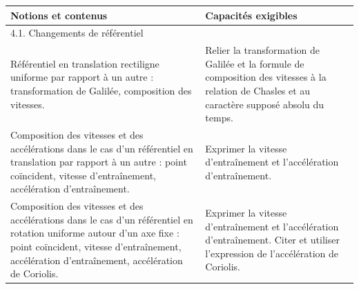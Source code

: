 \begin{tabularx}{\textwidth}[t]{|X|X|}
  \hline \textbf{Notions et contenus} & \textbf{Capacités exigibles} \\
  \hline \multicolumn{2}{|l|}{ 4.1. Changements de référentiel } \\
  \hline 
    Référentiel en translation rectiligne uniforme 
    par rapport à un autre : transformation de 
    Galilée, composition des vitesses.
   & 
    Relier la transformation de Galilée et la 
    formule de composition des vitesses à la 
    relation de Chasles et au caractère 
    supposé absolu du temps.
  \\
  \hline 
    Composition des vitesses et des 
    accélérations dans le cas d'un référentiel en 
    translation par rapport à un autre : point 
    coïncident, vitesse d'entraînement, 
    accélération d'entraînement.
   & 
    Exprimer la vitesse d'entraînement et 
    l'accélération d'entraînement.
  \\
  \hline 
    Composition des vitesses et des accélérations 
    dans le cas d'un référentiel en rotation 
    uniforme autour d'un axe fixe : point 
    coïncident, vitesse d'entraînement, 
    accélération d'entraînement, accélération de 
    Coriolis.
   & 
    Exprimer la vitesse d'entraînement et 
    l'accélération d'entraînement. 
    Citer et utiliser l'expression de l'accélération 
    de Coriolis.
  \\
  \hline
\end{tabularx}

